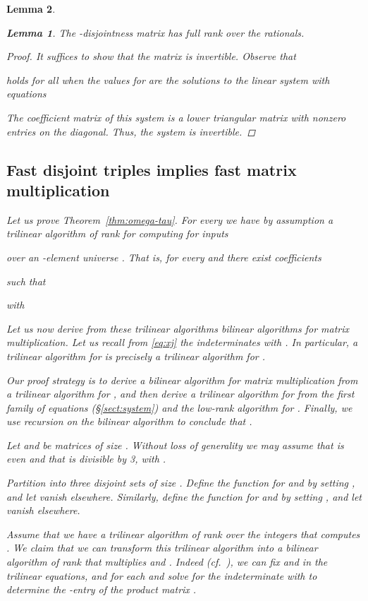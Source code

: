 \documentclass{amsart}
\newtheorem{Lem}{Lemma}
\begin{document}
\begin{Lem}
\begin{Lem}
\label{lem:disjmat}
The -disjointness matrix has full rank over the rationals.
\end{Lem}

\begin{proof}
It suffices to show that the matrix is invertible. Observe that

holds for all  when the values  
for  are the solutions to the  
linear system with equations

The coefficient matrix of this system is a lower triangular matrix
with nonzero entries on the diagonal. Thus, the system is invertible.
\end{proof}
 

\subsection{Fast disjoint triples implies fast matrix multiplication}

Let us prove Theorem~\ref{thm:omega-tau}.
For every  
we have by assumption a trilinear algorithm of rank  for 
computing  for inputs 

over an -element universe .
That is, for every  and  there exist coefficients 
 
such that

with


Let us now derive from these trilinear algorithms
bilinear algorithms for matrix multiplication.
Let us recall from \eqref{eq:xj} the indeterminates  
with . In particular, a trilinear algorithm
for  is precisely a trilinear algorithm for .

Our proof strategy is to derive a bilinear algorithm for matrix
multiplication from a trilinear algorithm for , and then
derive a trilinear algorithm for  from the first family 
of equations (\S\ref{sect:system}) and the low-rank algorithm 
for . Finally, we use recursion on the bilinear algorithm
to conclude that .

Let  and  be matrices of size . 
Without loss of generality we may assume that  is even and 
that  is divisible by 3, with . 

Partition  into three disjoint sets  of size .
Define the function  for 
 and 
by setting , and let  vanish
elsewhere.
Similarly, define the function  for 
 and 
by setting , and let  vanish
elsewhere.

Assume that we have a trilinear algorithm of rank  over the integers 
that computes . We claim that we can transform this trilinear 
algorithm into a bilinear algorithm of rank  that multiplies  and . 
Indeed (cf.~\cite[\S9]{Pan1984}), we can fix  and  in 
the trilinear equations, and for each  and 
 solve for the indeterminate  with 
 to determine the -entry of the product 
matrix .


\end{Lem}
\end{document}
